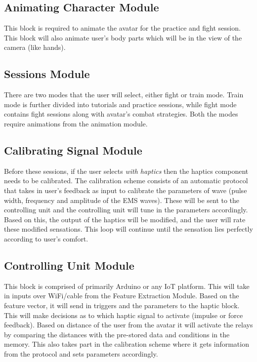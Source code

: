 \subsection{Animating Character Module}
This block is required to animate the avatar for the practice and fight session. This block will also animate user's body parts which will be in the view of the camera (like hands). 

\subsection{Sessions Module}
There are two modes that the user will select, either fight or train mode. Train mode is further divided into tutorials and practice sessions, while fight mode contains fight sessions along with avatar's combat strategies. Both the modes require animations from the animation module. 

\subsection{Calibrating Signal Module}
Before these sessions, if the user selects \textit{with haptics} then the haptics component needs to be calibrated. The calibration scheme consists of an automatic protocol that takes in user’s feedback as input to calibrate the parameters of wave (pulse width, frequency and amplitude of the EMS waves). These will be sent to the controlling unit and the controlling unit will tune in the parameters accordingly. Based on this, the output of the haptics will be modified, and the user will rate these modified sensations. This loop will continue until the sensation lies perfectly according to user's comfort. 

\subsection{Controlling Unit Module}
This block is comprised of primarily Arduino or any IoT platform. This will take in inputs over WiFi/cable from the Feature Extraction Module. Based on the feature vector, it will send in triggers and the parameters to the haptic block. This will make decisions as to which haptic signal to activate (impulse or force feedback). Based on distance of the user from the avatar it will activate the relays by comparing the distances with the pre-stored data and conditions in the memory. This also takes part in the calibration scheme where it gets information from the protocol and sets parameters accordingly.

